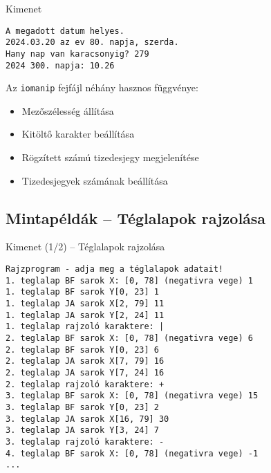 \documentclass[usenames,dvipsnames,aspectratio=169]{beamer}
\begin{document}
\begin{frame}[fragile]
  \begin{block}{Kimenet}
    \vspace{-.2cm}
    \begin{verbatim}
A megadott datum helyes.
2024.03.20 az ev 80. napja, szerda.
Hany nap van karacsonyig? 279
2024 300. napja: 10.26
\end{verbatim}
    \vspace{-.2cm}
  \end{block}
  Az \texttt{iomanip} fejfájl néhány hasznos függvénye:
  \begin{itemize}
    \item[\hiv{\href{https://en.cppreference.com/w/cpp/io/manip/setw}{\texttt{setw()}}}] Mezőszélesség állítása
    \item[\hiv{\href{https://en.cppreference.com/w/cpp/io/manip/setfill}{\texttt{setfill()}}}] Kitöltő karakter beállítása
    \item[\hiv{\href{https://en.cppreference.com/w/cpp/io/manip/fixed}{\texttt{fixed}}}] Rögzített számú tizedesjegy megjelenítése
    \item[\hiv{\href{https://en.cppreference.com/w/cpp/io/manip/setprecision}{\texttt{setprecision()}}}] Tizedesjegyek számának beállítása
  \end{itemize}
\end{frame}

\subsection{Mintapéldák -- Téglalapok rajzolása}
\begin{frame}[fragile]
  \scriptsize
  \begin{block}{Kimenet (1/2) -- Téglalapok rajzolása}
    \vspace{-.3cm}
    \begin{verbatim}
Rajzprogram - adja meg a téglalapok adatait!
1. teglalap BF sarok X: [0, 78] (negativra vege) 1
1. teglalap BF sarok Y[0, 23] 1
1. teglalap JA sarok X[2, 79] 11
1. teglalap JA sarok Y[2, 24] 11
1. teglalap rajzoló karaktere: |
2. teglalap BF sarok X: [0, 78] (negativra vege) 6
2. teglalap BF sarok Y[0, 23] 6
2. teglalap JA sarok X[7, 79] 16
2. teglalap JA sarok Y[7, 24] 16
2. teglalap rajzoló karaktere: +
3. teglalap BF sarok X: [0, 78] (negativra vege) 15
3. teglalap BF sarok Y[0, 23] 2
3. teglalap JA sarok X[16, 79] 30
3. teglalap JA sarok Y[3, 24] 7
3. teglalap rajzoló karaktere: -
4. teglalap BF sarok X: [0, 78] (negativra vege) -1
...
\end{verbatim}
    \vspace{-.3cm}
  \end{block}
\end{frame}
\end{document}
